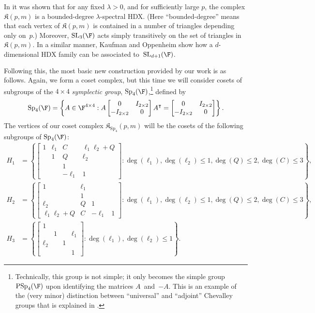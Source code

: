 \documentclass[11pt]{article}
\newcommand{\SL}{{\mathrm{SL}}}
\newcommand{\SP}{{\mathrm{Sp}}}
\newcommand{\PSp}{{\mathrm{PSp}}}
\newcommand{\complex}{\mathfrak{K}}
\begin{document}
In \cite{KO18} it was shown that for any fixed $\lambda > 0$, and for sufficiently large $p$, the complex $\complex(p,m)$ is a bounded-degree $\lambda$-spectral HDX.
(Here ``bounded-degree'' means that each vertex of $\complex(p,m)$ is contained in a number of triangles depending only on~$p$.)
Moreover, $\SL_3(\F)$ acts simply transitively on the set of triangles in $\complex(p,m)$.
In a similar manner, Kaufman and Oppenheim show how a $d$-dimensional HDX family can be associated to~$\SL_{d+1}(\F)$.

Following this, the most basic new construction provided by our work is as follows.
Again, we form a coset complex, but this time we will consider cosets of subgroups of the $4 \times 4$ \emph{symplectic group}, $\SP_4(\F)$,\footnote{%
Technically, this group is not simple; it only becomes the simple group $\PSp_4(\F)$ upon identifying the matrices $A$~and~$-A$.
This is an example of the (very minor) distinction between ``universal'' and ``adjoint'' Chevalley groups that is explained in .\label{foot:universal}} defined by
\[\SP_4(\F) = \left \{ A \in \F^{4 \times 4} : A\begin{bmatrix}
0 & I_{2\times 2}\\
-I_{2\times 2} & 0
\end{bmatrix}A^\intercal = \begin{bmatrix}
0 & I_{2\times 2}\\
-I_{2\times 2} & 0
\end{bmatrix} \right \} .\]
The vertices of our coset complex $\complex_{\SP_4}(p,m)$ will be the cosets of the following subgroups of $\SP_4(\F)$:
\begin{align*}
H_1 &=
\left \{ \begin{bmatrix}
1 & \ell_1 & C & \ell_1 \ell_2 + Q\\
 & 1 & Q & \ell_2\\
 &  & 1& \\
 &  & -\ell_1 & 1
\end{bmatrix} : \deg(\ell_1),\deg(\ell_2) \le 1, \deg(Q) \le 2, \deg(C) \le 3 \right \},\\
H_2 &=
\left \{ \begin{bmatrix}
1 & \ell_1 &  & \\
 & 1 &  & \\
\ell_2 & Q & 1& \\
\ell_1 \ell_2 + Q & C & -\ell_1 & 1
\end{bmatrix}  : \deg(\ell_1),\deg(\ell_2) \le 1, \deg(Q) \le 2, \deg(C) \le 3 \right \},\\
H_3 &= \left \{
\begin{bmatrix}
1 &  &  & \\
 & 1 &  & \ell_1\\
\ell_2 &  & 1& \\
 &   &  & 1
\end{bmatrix} : \deg(\ell_1), \deg(\ell_2) \le 1 \right \}.
\end{align*}
\end{document}
